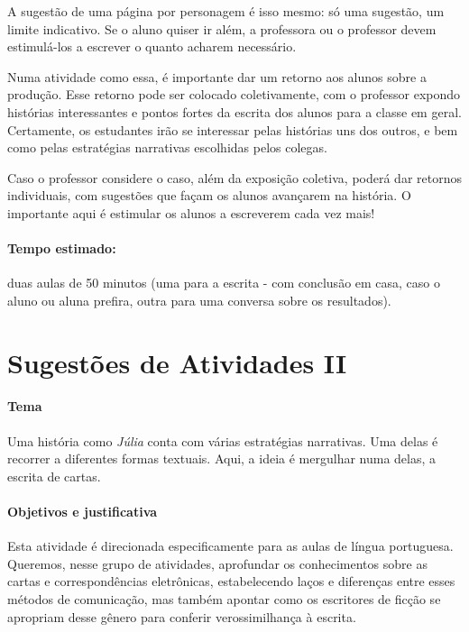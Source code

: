 \documentclass[12pt]{extarticle}
\begin{document}
A sugestão de uma página por personagem é isso mesmo: só uma sugestão,
um limite indicativo. Se o aluno quiser ir além, a professora ou o
professor devem estimulá-los a escrever o quanto acharem necessário.

Numa atividade como essa, é importante dar um retorno aos alunos sobre a
produção. Esse retorno pode ser colocado coletivamente, com o professor
expondo histórias interessantes e pontos fortes da escrita dos alunos
para a classe em geral. Certamente, os estudantes irão se interessar
pelas histórias uns dos outros, e bem como pelas estratégias narrativas
escolhidas pelos colegas.

Caso o professor considere o caso, além da exposição coletiva, poderá
dar retornos individuais, com sugestões que façam os alunos avançarem na
história. O importante aqui é estimular os alunos a escreverem cada vez
mais!

\paragraph{Tempo estimado:} duas aulas de 50 minutos (uma para a escrita -
com conclusão em casa, caso o aluno ou aluna prefira, outra para uma
conversa sobre os resultados).

\section{Sugestões de Atividades II}

\paragraph{Tema}

Uma história como \emph{Júlia} conta com várias estratégias narrativas.
Uma delas é recorrer a diferentes formas textuais. Aqui, a ideia é
mergulhar numa delas, a escrita de cartas.



\paragraph{Objetivos e justificativa}

Esta atividade é direcionada especificamente para as aulas de língua
portuguesa. Queremos, nesse grupo de atividades, aprofundar os
conhecimentos sobre as cartas e correspondências eletrônicas,
estabelecendo laços e diferenças entre esses métodos de comunicação, mas
também apontar como os escritores de ficção se apropriam desse gênero
para conferir verossimilhança à escrita.
\end{document}
